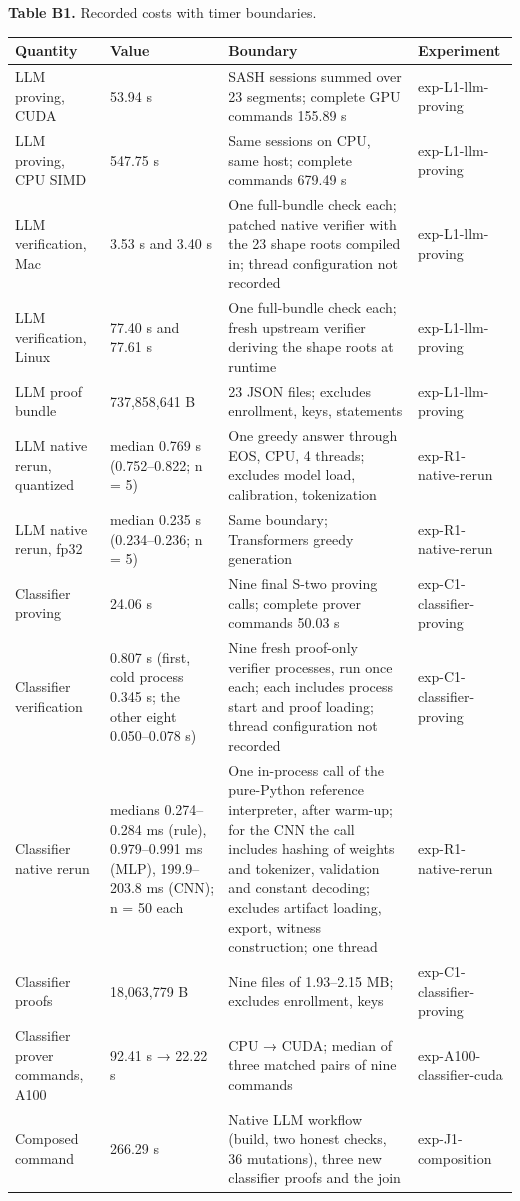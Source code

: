 \documentclass[11pt]{article}
\begin{document}
\textbf{Table B1.} Recorded costs with timer boundaries.

{\small
\begin{xltabular}{\linewidth}{XXXX}
\toprule
\textbf{Quantity} & \textbf{Value} & \textbf{Boundary} & \textbf{Experiment} \\ \midrule
\endhead
LLM proving, CUDA & 53.94 s & SASH sessions summed over 23 segments; complete GPU commands 155.89 s & exp-L1-llm-proving \\
LLM proving, CPU SIMD & 547.75 s & Same sessions on CPU, same host; complete commands 679.49 s & exp-L1-llm-proving \\
LLM verification, Mac & 3.53 s and 3.40 s & One full-bundle check each; patched native verifier with the 23 shape roots compiled in; thread configuration not recorded & exp-L1-llm-proving \\
LLM verification, Linux & 77.40 s and 77.61 s & One full-bundle check each; fresh upstream verifier deriving the shape roots at runtime & exp-L1-llm-proving \\
LLM proof bundle & 737,858,641 B & 23 JSON files; excludes enrollment, keys, statements & exp-L1-llm-proving \\
LLM native rerun, quantized & median 0.769 s (0.752--0.822; n = 5) & One greedy answer through EOS, CPU, 4 threads; excludes model load, calibration, tokenization & exp-R1-native-rerun \\
LLM native rerun, fp32 & median 0.235 s (0.234--0.236; n = 5) & Same boundary; Transformers greedy generation & exp-R1-native-rerun \\
Classifier proving & 24.06 s & Nine final S-two proving calls; complete prover commands 50.03 s & exp-C1-classifier-proving \\
Classifier verification & 0.807 s (first, cold process 0.345 s; the other eight 0.050--0.078 s) & Nine fresh proof-only verifier processes, run once each; each includes process start and proof loading; thread configuration not recorded & exp-C1-classifier-proving \\
Classifier native rerun & medians 0.274--0.284 ms (rule), 0.979--0.991 ms (MLP), 199.9--203.8 ms (CNN); n = 50 each & One in-process call of the pure-Python reference interpreter, after warm-up; for the CNN the call includes hashing of weights and tokenizer, validation and constant decoding; excludes artifact loading, export, witness construction; one thread & exp-R1-native-rerun \\
Classifier proofs & 18,063,779 B & Nine files of 1.93--2.15 MB; excludes enrollment, keys & exp-C1-classifier-proving \\
Classifier prover commands, A100 & 92.41 s → 22.22 s & CPU → CUDA; median of three matched pairs of nine commands & exp-A100-classifier-cuda \\
Composed command & 266.29 s & Native LLM workflow (build, two honest checks, 36 mutations), three new classifier proofs and the join & exp-J1-composition \\
\bottomrule
\end{xltabular}}
\end{document}
